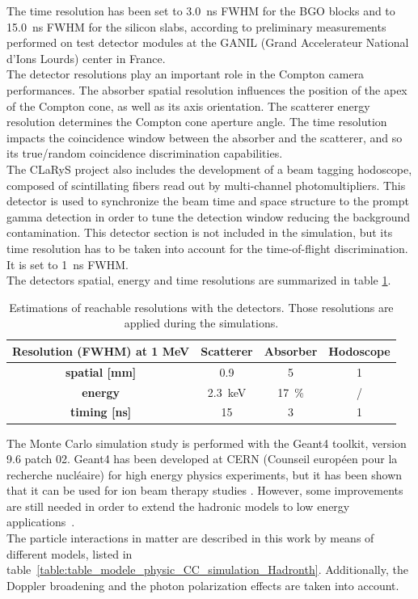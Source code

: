 The time resolution has been set to 3.0~ns FWHM for the BGO blocks and to 15.0~ns FWHM for the silicon slabs, according to preliminary measurements performed on test detector modules at the GANIL (Grand Accelerateur National d'Ions Lourds) center in France.\\
The detector resolutions play an important role in the Compton camera performances. The absorber spatial resolution influences the position of the apex of the Compton cone, as well as its axis orientation. The scatterer energy resolution determines the Compton cone aperture angle. The time resolution impacts the coincidence window between the absorber and the scatterer, and so its true/random coincidence discrimination capabilities.\\
The CLaRyS project also includes the development of a beam tagging hodoscope, composed of scintillating fibers read out by multi-channel photomultipliers. This detector is used to synchronize the beam time and space structure to the prompt gamma detection in order to tune the detection window reducing the background contamination. This detector section is not included in the simulation, but its time resolution has to be taken into account for the time-of-flight discrimination. It is set to 1~ns FWHM.\\ 
The detectors spatial, energy and time resolutions are summarized in table \ref{table:table_resolution_detecteurs_CC_simulation_Hadronth}.

\begin{table} [!htbp]
\centering
\caption{Estimations of reachable resolutions with the detectors. Those resolutions are applied during the simulations.}
\begin{tabular}{cccc}
\hline
\textbf{Resolution (FWHM) at 1 MeV} & \textbf{Scatterer} & \textbf{Absorber} & \textbf{Hodoscope}\\
\hline 
\textbf{spatial [mm]	}			 &     0.9		 &  5 &	 1\\
\textbf{energy}				&	2.3~keV		&  17~\%	&	/\\
\textbf{timing [ns]}	        		&	15			&	3 	&  1\\
\hline
\end{tabular}
\label{table:table_resolution_detecteurs_CC_simulation_Hadronth}
\end{table}
    
The Monte Carlo simulation study is performed with the Geant4 toolkit, version 9.6 patch 02. Geant4 has been developed at CERN (Counseil europ\'{e}en pour la recherche nucl\'{e}aire) for high energy physics experiments, but it has been shown that it can be used for ion beam therapy studies \cite{cirrone_hadrontherapy_2011,toshito_new_2010}. However, some improvements are still needed in order to extend the hadronic models to low energy applications~\cite{dedes_assessment_2014, Pinto:2016aa}.\\
The particle interactions in matter are described in this work by means of different models, listed in table~\ref{table:table_modele_physic_CC_simulation_Hadronth}. Additionally, the Doppler broadening and the photon polarization effects are taken into account.\\ 

